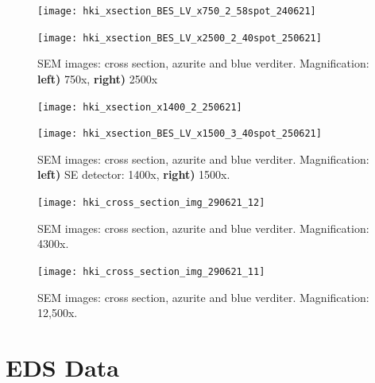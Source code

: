 \begin{figure}[H]
\centering
\begin{minipage}{.45\textwidth}
  \centering
  \texttt{[image: hki\_xsection\_BES\_LV\_x750\_2\_58spot\_240621]}     
\end{minipage}
\begin{minipage}{.45\textwidth}
  \centering
  \texttt{[image: hki\_xsection\_BES\_LV\_x2500\_2\_40spot\_250621]}    
\end{minipage}
\caption[SEM images: cross section, azurite and blue verditer]{SEM images: cross section, azurite and blue verditer. Magnification: \textbf{left)} 750x, \textbf{right)} 2500x}
\label{fig:xsection_jeol_1}
\end{figure}

\begin{figure}[H]
\centering
\begin{minipage}{.45\textwidth}
  \centering
  \texttt{[image: hki\_xsection\_x1400\_2\_250621]}
\end{minipage}
\begin{minipage}{.45\textwidth}
  \centering
  \texttt{[image: hki\_xsection\_BES\_LV\_x1500\_3\_40spot\_250621]}
\end{minipage}
\caption[SEM images: cross section, azurite and blue verditer]{SEM images: cross section, azurite and blue verditer. Magnification: \textbf{left)} SE detector: 1400x, \textbf{right)} 1500x.}
\label{fig:xsection_jeol_2}
\end{figure}

\begin{figure}[H]
\centering
  \texttt{[image: hki\_cross\_section\_img\_290621\_12]}
\caption[SEM images: cross section, azurite and blue verditer]{SEM images: cross section, azurite and blue verditer. Magnification: 4300x.}
\label{fig:xsection_dept_1}
\end{figure}

\begin{figure}[H]
\centering
  \texttt{[image: hki\_cross\_section\_img\_290621\_11]}
\caption[SEM images: cross section, azurite and blue verditer]{SEM images: cross section, azurite and blue verditer. Magnification: 12,500x.}
\label{fig:xsection_dept_2}
\end{figure}


\section[EDS Data]{EDS Data}
\label{section3.2}

